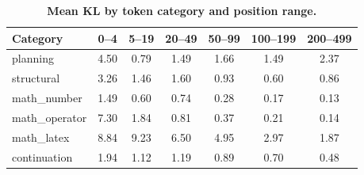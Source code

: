 \documentclass[10pt]{article}
\begin{document}
\begin{table}[!htbp]
\centering
\caption{\textbf{Mean KL by token category and position range.}}
\label{tab:app_kl_by_category}
\small
\begin{tabular}{lcccccc}
\toprule
\textbf{Category} & \textbf{0--4} & \textbf{5--19} & \textbf{20--49} & \textbf{50--99} & \textbf{100--199} & \textbf{200--499} \\
\midrule
planning & 4.50 & 0.79 & 1.49 & 1.66 & 1.49 & 2.37 \\
structural & 3.26 & 1.46 & 1.60 & 0.93 & 0.60 & 0.86 \\
math\_number & 1.49 & 0.60 & 0.74 & 0.28 & 0.17 & 0.13 \\
math\_operator & 7.30 & 1.84 & 0.81 & 0.37 & 0.21 & 0.14 \\
math\_latex & 8.84 & 9.23 & 6.50 & 4.95 & 2.97 & 1.87 \\
continuation & 1.94 & 1.12 & 1.19 & 0.89 & 0.70 & 0.48 \\
\bottomrule
\end{tabular}
\end{table}
\end{document}
